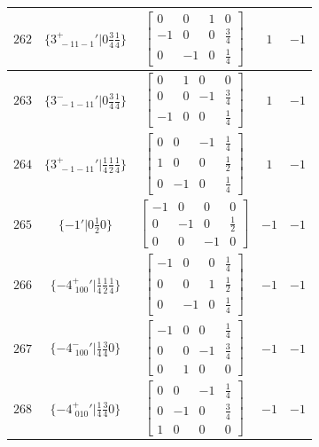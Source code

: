 \documentclass[fleqn,8pt]{jsarticle}
\begin{document}
\begin{longtable}{ccccc}
$ 262 $ & $ \{3^{+}_{\,\,-11-1}{}'|0 \frac{3}{4} \frac{1}{4}\} $ & $ \begin{bmatrix} 0 & 0 & 1 & 0 \\ -1 & 0 & 0 & \frac{3}{4} \\ 0 & -1 & 0 & \frac{1}{4} \end{bmatrix} $ & $ 1 $ & $ -1 $ \\ \hline
$ 263 $ & $ \{3^{-}_{\,\,-1-11}{}'|0 \frac{3}{4} \frac{1}{4}\} $ & $ \begin{bmatrix} 0 & 1 & 0 & 0 \\ 0 & 0 & -1 & \frac{3}{4} \\ -1 & 0 & 0 & \frac{1}{4} \end{bmatrix} $ & $ 1 $ & $ -1 $ \\ \hline
$ 264 $ & $ \{3^{+}_{\,\,-1-11}{}'|\frac{1}{4} \frac{1}{2} \frac{1}{4}\} $ & $ \begin{bmatrix} 0 & 0 & -1 & \frac{1}{4} \\ 1 & 0 & 0 & \frac{1}{2} \\ 0 & -1 & 0 & \frac{1}{4} \end{bmatrix} $ & $ 1 $ & $ -1 $ \\ \hline
$ 265 $ & $ \{-1{}'|0 \frac{1}{2} 0\} $ & $ \begin{bmatrix} -1 & 0 & 0 & 0 \\ 0 & -1 & 0 & \frac{1}{2} \\ 0 & 0 & -1 & 0 \end{bmatrix} $ & $ -1 $ & $ -1 $ \\ \hline
$ 266 $ & $ \{-4^{+}_{\,\,100}{}'|\frac{1}{4} \frac{1}{2} \frac{1}{4}\} $ & $ \begin{bmatrix} -1 & 0 & 0 & \frac{1}{4} \\ 0 & 0 & 1 & \frac{1}{2} \\ 0 & -1 & 0 & \frac{1}{4} \end{bmatrix} $ & $ -1 $ & $ -1 $ \\ \hline
$ 267 $ & $ \{-4^{-}_{\,\,100}{}'|\frac{1}{4} \frac{3}{4} 0\} $ & $ \begin{bmatrix} -1 & 0 & 0 & \frac{1}{4} \\ 0 & 0 & -1 & \frac{3}{4} \\ 0 & 1 & 0 & 0 \end{bmatrix} $ & $ -1 $ & $ -1 $ \\ \hline
$ 268 $ & $ \{-4^{+}_{\,\,010}{}'|\frac{1}{4} \frac{3}{4} 0\} $ & $ \begin{bmatrix} 0 & 0 & -1 & \frac{1}{4} \\ 0 & -1 & 0 & \frac{3}{4} \\ 1 & 0 & 0 & 0 \end{bmatrix} $ & $ -1 $ & $ -1 $ \\ \hline

\end{longtable}
\end{document}
